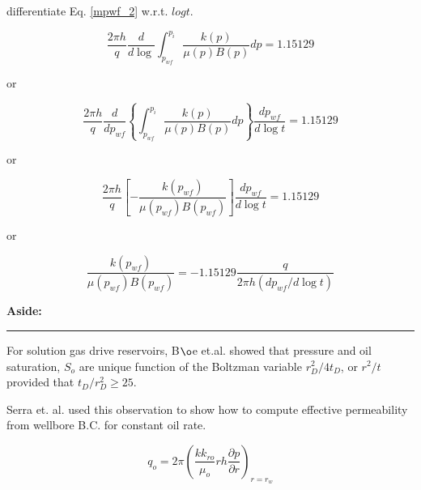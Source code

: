 \documentclass{llncs}
\numberwithin{equation}{section}
\numberwithin{figure}{section}
\numberwithin{table}{section}
\begin{document}
     differentiate Eq. \ref{mpwf_2} w.r.t. $logt$.

    \begin{equation}
    \frac{2\pi h}{q}\frac{d}{d\log }\int_{{{p}_{wf}}}^{{{p}_{i}}}{\frac{k\left( p \right)}{\mu \left( p \right)B\left( p \right)}}dp=1.15129
        \label{semilog_slope_1}
    \end{equation}

    or

    \begin{equation*}
        \frac{2\pi h}{q}\frac{d}{d{{p}_{wf}}}\left\{ \int_{{{p}_{wf}}}^{{{p}_{i}}}{\frac{k\left( p \right)}{\mu \left( p \right)B\left( p \right)}}dp \right\}\frac{d{{p}_{wf}}}{d\log t}=1.15129
    \end{equation*}

    or

    \begin{equation*}
        \frac{2\pi h}{q}\left[ -\frac{k\left( {{p}_{wf}} \right)}{\mu \left( {{p}_{wf}} \right)B\left( {{p}_{wf}} \right)} \right]\frac{d{{p}_{wf}}}{d\log t}=1.15129
    \end{equation*}

    or

    \begin{equation}
        \frac{k\left( {{p}_{wf}} \right)}{\mu \left( {{p}_{wf}} \right)B\left( {{p}_{wf}} \right)}=-\text{1}\text{.15129}\frac{q}{2\pi h\left( d{{p}_{wf}}/d\log t \right)}
        \label{semilog_slope2}
    \end{equation}

    \vspace{15pt}
    \large{\textbf{Aside:}}\\
    \rule{\textwidth}{1pt}
    For solution gas drive reservoirs, B${\o}$e et.al.\cite{Boe_1989_1}  showed that pressure and oil saturation, $S_{o}$ are unique function of the Boltzman variable $r_{D}^{2}/4t_{D}$, or $r^{2}/t$ provided that $t_{D}/r_{D}^{2}\geq25$.

    Serra et. al. \cite{Serra_1990_1} used this observation to show how to compute effective permeability from wellbore B.C. for constant oil rate.

    \begin{equation}
        {{q}_{o}}=2\pi {{\left( \frac{k{{k}_{ro}}}{{{\mu }_{o}}}rh\frac{\partial p}{\partial r} \right)}_{r={{r}_{w}}}}
        \label{q_rw}
    \end{equation}
\end{document}
